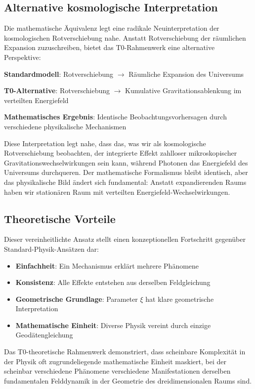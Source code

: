 \documentclass[12pt,a4paper]{article}
\theoremstyle{definition}
\begin{document}
	\subsection{Alternative kosmologische Interpretation}
	
	Die mathematische \"Aquivalenz legt eine radikale Neuinterpretation der kosmologischen Rotverschiebung nahe. Anstatt Rotverschiebung der r\"aumlichen Expansion zuzuschreiben, bietet das T0-Rahmenwerk eine alternative Perspektive:
	
	\begin{tcolorbox}[colback=green!5!white,colframe=green!75!black,title=Alternatives kosmologisches Modell]
		\textbf{Standardmodell}: Rotverschiebung $\rightarrow$ R\"aumliche Expansion des Universums
		
		\textbf{T0-Alternative}: Rotverschiebung $\rightarrow$ Kumulative Gravitationsablenkung im verteilten Energiefeld
		
		\textbf{Mathematisches Ergebnis}: Identische Beobachtungsvorhersagen durch verschiedene physikalische Mechanismen
	\end{tcolorbox}
	
	Diese Interpretation legt nahe, dass das, was wir als kosmologische Rotverschiebung beobachten, der integrierte Effekt zahlloser mikroskopischer Gravitationswechselwirkungen sein kann, w\"ahrend Photonen das Energiefeld des Universums durchqueren. Der mathematische Formalismus bleibt identisch, aber das physikalische Bild \"andert sich fundamental: Anstatt expandierenden Raums haben wir station\"aren Raum mit verteilten Energiefeld-Wechselwirkungen.
	
	\subsection{Theoretische Vorteile}
	
	Dieser vereinheitlichte Ansatz stellt einen konzeptionellen Fortschritt gegen\"uber Standard-Physik-Ans\"atzen dar:
	
	\begin{itemize}
		\item \textbf{Einfachheit}: Ein Mechanismus erkl\"art mehrere Ph\"anomene
		\item \textbf{Konsistenz}: Alle Effekte entstehen aus derselben Feldgleichung
		\item \textbf{Geometrische Grundlage}: Parameter $\xi$ hat klare geometrische Interpretation
		\item \textbf{Mathematische Einheit}: Diverse Physik vereint durch einzige Geod\"atengleichung
	\end{itemize}
	
	Das T0-theoretische Rahmenwerk demonstriert, dass scheinbare Komplexit\"at in der Physik oft zugrundeliegende mathematische Einheit maskiert, bei der scheinbar verschiedene Ph\"anomene verschiedene Manifestationen derselben fundamentalen Felddynamik in der Geometrie des dreidimensionalen Raums sind.
	
\end{document}
